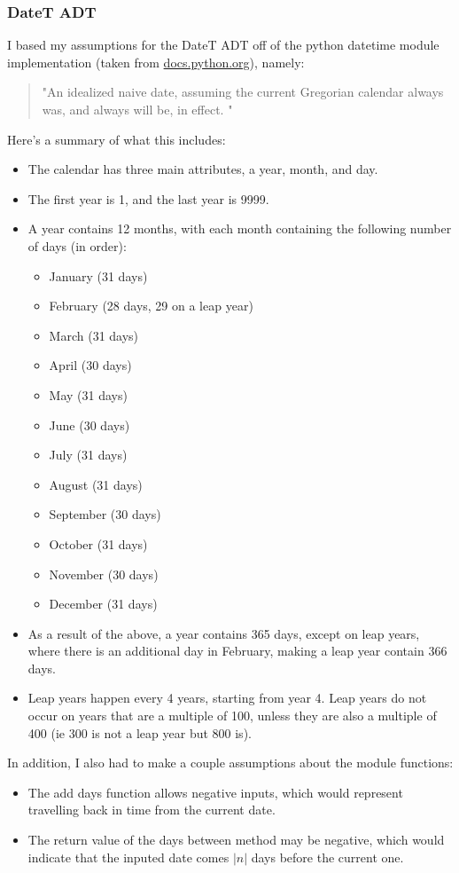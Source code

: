 \documentclass[12pt]{article}
\begin{document}
\subsubsection{DateT ADT}
I based my assumptions for the DateT ADT off of the python datetime module implementation (taken from \url{docs.python.org}), namely:
\begin{quotation}
  "An idealized naive date, assuming the current Gregorian calendar always was, and always will be, in effect. "
\end{quotation}
Here's a summary of what this includes:
\begin{itemize}
  \item The calendar has three main attributes, a year, month, and day.
  \item The first year is 1, and the last year is 9999.
  \item A year contains 12 months, with each month containing the following number of days (in order):
  \begin{itemize}
      \item January (31 days)
      \item February (28 days, 29 on a leap year)
      \item March (31 days)
      \item April (30 days)
      \item May (31 days)
      \item June (30 days)
      \item July (31 days)
      \item August (31 days)
      \item September (30 days)
      \item October (31 days)
      \item November (30 days)
      \item December (31 days)
  \end{itemize}
  \item As a result of the above, a year contains 365 days, except on leap years, where there is an additional day in February, making a leap year contain 366 days.
  \item Leap years happen every 4 years, starting from year 4. Leap years do not occur on years that are a multiple of 100, unless they are also a multiple of 400 (ie 300 is not a leap year but 800 is).
\end{itemize}

In addition, I also had to make a couple assumptions about the module functions:
\begin{itemize}
  \item The add days function allows negative inputs, which would represent travelling back in time from the current date.
  \item The return value of the days between method may be negative, which would indicate that the inputed date comes $|n|$ days before the current one.
\end{itemize}
\end{document}
